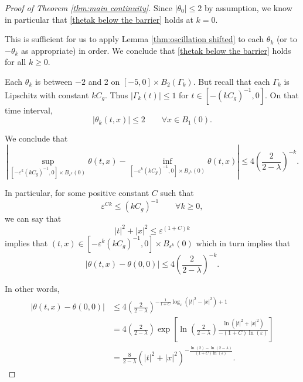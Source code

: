\documentclass[11pt]{amsart}
\theoremstyle{remark}
\theoremstyle{definition}
\newcommand{\eps}{\varepsilon}
\newcommand{\paren}[1]{\left( #1 \right)}
\newcommand{\bracket}[1]{\left[ #1 \right]}
\newcommand{\abs}[1]{\left\lvert #1 \right\rvert}
\newcommand{\n}{^{-1}}
\newcommand{\Cgamma}{C_g}
\begin{document}
\begin{proof}[Proof of Theorem \ref{thm:main continuity}]
Since $|\theta_0|\leq 2$ by assumption, we know in particular that \eqref{thetak below the barrier} holds at $k=0$.  

This is sufficient for us to apply Lemma \ref{thm:oscillation shifted} to each $\theta_k$ (or to $-\theta_k$ as appropriate) in order.  We conclude that \eqref{thetak below the barrier} holds for all $k \geq 0$.  

Each $\theta_k$ is between $-2$ and 2 on $[-5,0]\times B_2(\Gamma_k)$.  But recall that each $\Gamma_k$ is Lipschitz with constant $k \Cgamma$.  Thus $|\Gamma_k(t)|\leq 1$ for $t \in [-(k \Cgamma)\n, 0]$.  On that time interval, 
\[ \abs{\theta_k(t,x)} \leq 2 \qquad \forall x \in B_1(0). \]

We conclude that
\[ \abs{ \sup_{[-\eps^k (k \Cgamma)\n, 0] \times B_{\eps^k}(0)} \theta(t,x) - \inf_{[-\eps^k (k \Cgamma)\n, 0] \times B_{\eps^k}(0)} \theta(t,x) } \leq 4 \paren{\frac{2}{2-\lambda}}^{-k}. \]

In particular, for some positive constant $C$ such that
\[ \eps^{C k} \leq (k \Cgamma)\n \qquad \forall k \geq 0, \]
we can say that
\[ |t|^2 + |x|^2 \leq \eps^{(1+C)k} \]	
implies that $(t,x) \in [-\eps^k (k \Cgamma)\n, 0] \times B_{\eps^k}(0)$ which in turn implies that
\[ \abs{\theta(t,x) - \theta(0,0)} \leq  4 \paren{\frac{2}{2-\lambda}}^{-k}. \]

In other words,
\begin{align*} 
\abs{\theta(t,x) - \theta(0,0)} &\leq 4 \paren{\frac{2}{2-\lambda}}^{ -\frac{1}{1+C} \log_\eps(|t|^2 - |x|^2)  + 1} 
\\ &= 4 \paren{\frac{2}{2-\lambda}} \exp\bracket{\ln\paren{\frac{2}{2-\lambda}} \frac{\ln(|t|^2 + |x|^2)}{-(1+C)\ln(\eps)}}
\\ &= \frac{8}{2-\lambda} (|t|^2 + |x|^2)^{-\frac{\ln(2) - \ln(2-\lambda)}{(1+C)\ln(\eps)}}.
\end{align*}

\end{proof}




\end{document}
